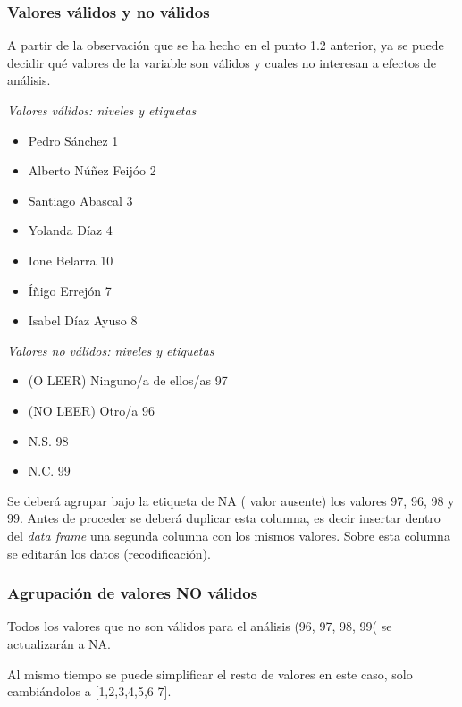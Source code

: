 \documentclass[
]{article}
\providecommand{\tightlist}{%
  \setlength{\itemsep}{0pt}\setlength{\parskip}{0pt}}
\begin{document}
\hypertarget{valores-vuxe1lidos-y-no-vuxe1lidos}{%
\subsubsection{Valores válidos y no
válidos}\label{valores-vuxe1lidos-y-no-vuxe1lidos}}

A partir de la observación que se ha hecho en el punto 1.2 anterior, ya
se puede decidir qué valores de la variable son válidos y cuales no
interesan a efectos de análisis.

\emph{Valores válidos: niveles y etiquetas}

\begin{itemize}
\tightlist
\item
  Pedro Sánchez 1
\item
  Alberto Núñez Feijóo 2
\item
  Santiago Abascal 3
\item
  Yolanda Díaz 4
\item
  Ione Belarra 10
\item
  Íñigo Errejón 7
\item
  Isabel Díaz Ayuso 8
\end{itemize}

\emph{Valores no válidos: niveles y etiquetas}

\begin{itemize}
\tightlist
\item
  (O LEER) Ninguno/a de ellos/as 97
\item
  (NO LEER) Otro/a 96
\item
  N.S. 98
\item
  N.C. 99
\end{itemize}

Se deberá agrupar bajo la etiqueta de NA ( valor ausente) los valores
97, 96, 98 y 99. Antes de proceder se deberá duplicar esta columna, es
decir insertar dentro del \emph{data frame} una segunda columna con los
mismos valores. Sobre esta columna se editarán los datos
(recodificación).

\hypertarget{agrupaciuxf3n-de-valores-no-vuxe1lidos}{%
\subsubsection{Agrupación de valores NO
válidos}\label{agrupaciuxf3n-de-valores-no-vuxe1lidos}}

Todos los valores que no son válidos para el análisis (96, 97, 98, 99(
se actualizarán a NA.

Al mismo tiempo se puede simplificar el resto de valores en este caso,
solo cambiándolos a {[}1,2,3,4,5,6 7{]}.
\end{document}
